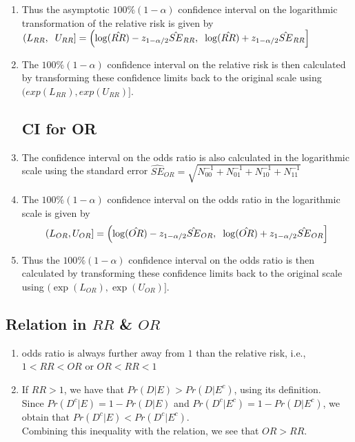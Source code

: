 \begin{enumerate}[itemsep=0.2cm]
    \item Thus the asymptotic $100\%(1 - \alpha)$ confidence interval on the logarithmic transformation of the relative risk is given by
    $
        (L_{RR}, \hspace{0.2cm} U_{RR}]
        = \left( 
            \log(\hat{RR}) - z_{1 - \alpha/2} \hat{SE}_{RR},
            \hspace{0.2cm}
            \log(\hat{RR}) + z_{1 - \alpha/2} \hat{SE}_{RR}
        \right]
    $

    \item The $100\%(1 - \alpha)$ confidence interval on the relative risk is then calculated by transforming these confidence limits back to the original scale using $(exp(L _{RR}), exp(U_{RR})]$.

    \subsection*{CI for OR \cite{ism-1}}

    \item The confidence interval on the odds ratio is also calculated in the logarithmic scale using the standard error $
        \hat{SE}_{OR}
        = \sqrt{N^{-1}_{00} + N^{-1}_{01} + N^{-1}_{10} + N^{-1}_{11}}
    $

    \item The $100\%(1 - \alpha)$ confidence interval on the odds ratio in the logarithmic scale is given by
    \[
        (L _{O R}, U_{O R}]
        = \left(
            \log(\hat{OR}) - z_{1-\alpha/2} \hat{SE}_{O R}, 
            \hspace{0.2cm}
            \log(\hat{OR}) + z_{1-\alpha/2} \hat{SE}_{O R}
        \right]
    \]

    \item Thus the $100\%(1 - \alpha)$ confidence interval on the odds ratio is then calculated by transforming these confidence limits back to the original scale using $(\exp(L_{O R}), \exp (U_{O R})]$.
\end{enumerate}




\subsection*{Relation in $RR$ \& $OR$ \cite{ism-1}}

\begin{enumerate}[itemsep=0.2cm]
    \item odds ratio is always further away from $1$ than the relative risk, i.e., $1 < RR < OR$ or $OR < RR < 1$

    \item If $RR > 1$, we have that $Pr(D|E) > Pr(D|E^c)$, using its definition. \\
    Since $Pr(D^c|E) = 1 - Pr(D|E)$ and $Pr(D^c|E^c) = 1 - Pr(D|E^c)$, we obtain that $Pr(D^c|E) < Pr(D^c|E^c)$.\\
    Combining this inequality with the relation, we see that $OR > RR$.

\end{enumerate}


